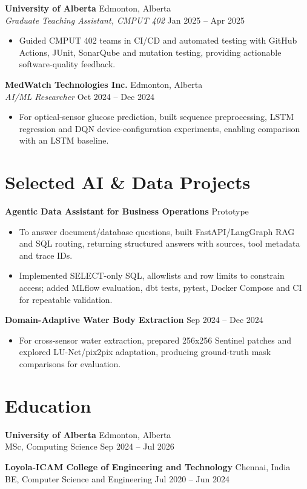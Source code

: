 \documentclass[10pt]{article}
\begin{document}
\textbf{University of Alberta}
\hfill Edmonton, Alberta\\
\textit{Graduate Teaching Assistant, CMPUT 402}
\hfill Jan 2025 -- Apr 2025

\begin{itemize}
    \item Guided CMPUT 402 teams in CI/CD and automated testing with GitHub Actions, JUnit, SonarQube and mutation testing, providing actionable software-quality feedback.
\end{itemize}

\textbf{MedWatch Technologies Inc.}
\hfill Edmonton, Alberta\\
\textit{AI/ML Researcher}
\hfill Oct 2024 -- Dec 2024

\begin{itemize}
    \item For optical-sensor glucose prediction, built sequence preprocessing, LSTM regression and DQN device-configuration experiments, enabling comparison with an LSTM baseline.
\end{itemize}

\section{Selected AI \& Data Projects}

\textbf{Agentic Data Assistant for Business Operations}
\hfill Prototype

\begin{itemize}
    \item To answer document/database questions, built FastAPI/LangGraph RAG and SQL routing, returning structured answers with sources, tool metadata and trace IDs.
    \item Implemented SELECT-only SQL, allowlists and row limits to constrain access; added MLflow evaluation, dbt tests, pytest, Docker Compose and CI for repeatable validation.
\end{itemize}

\textbf{Domain-Adaptive Water Body Extraction}
\hfill Sep 2024 -- Dec 2024

\begin{itemize}
    \item For cross-sensor water extraction, prepared 256x256 Sentinel patches and explored LU-Net/pix2pix adaptation, producing ground-truth mask comparisons for evaluation.
\end{itemize}

\section{Education}

\textbf{University of Alberta}
\hfill Edmonton, Alberta\\
MSc, Computing Science
\hfill Sep 2024 -- Jul 2026

\textbf{Loyola-ICAM College of Engineering and Technology}
\hfill Chennai, India\\
BE, Computer Science and Engineering
\hfill Jul 2020 -- Jun 2024
\end{document}
